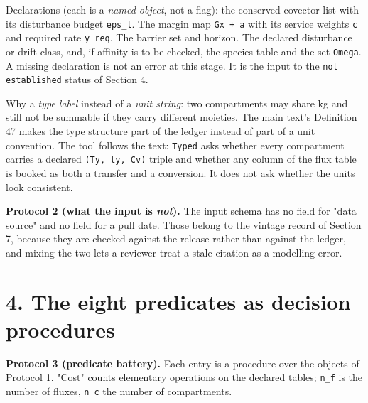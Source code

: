 \documentclass[11pt]{article}
\begin{document}
Declarations (each is a \emph{named object}, not a flag): the conserved-covector list with its disturbance budget \texttt{eps\_l}. The margin map \texttt{Gx + a} with its service weights \texttt{c} and required rate \texttt{y\_req}. The barrier set and horizon. The declared disturbance or drift class, and, if affinity is to be checked, the species table and the set \texttt{Omega}. A missing declaration is not an error at this stage. It is the input to the \texttt{not establis\allowbreak{}hed} status of Section 4.

Why a \emph{type label} instead of a \emph{unit string}: two compartments may share kg and still not be summable if they carry different moieties. The main text's Definition 47 makes the type structure part of the ledger instead of part of a unit convention. The tool follows the text: \texttt{Typed} asks whether every compartment carries a declared \texttt{(Ty, ty, Cv)} triple and whether any column of the flux table is booked as both a transfer and a conversion. It does not ask whether the units look consistent.

\textbf{Protocol 2 (what the input is \emph{not}).} The input schema has no field for "data source" and no field for a pull date. Those belong to the vintage record of Section 7, because they are checked against the release rather than against the ledger, and mixing the two lets a reviewer treat a stale citation as a modelling error.

\vspace{0.8em}

\section*{4. The eight predicates as decision procedures}\label{4-the-eight-predicates-as-decision-procedures}

\textbf{Protocol 3 (predicate battery).} Each entry is a procedure over the objects of Protocol 1. "Cost" counts elementary operations on the declared tables; \texttt{n\_f} is the number of fluxes, \texttt{n\_c} the number of compartments.
\end{document}
